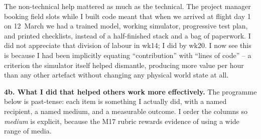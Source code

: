 The non-technical help mattered as much as the technical. The project manager booking field slots while I built code meant that when we arrived at flight day 1 on 12~March we had a trained model, working simulator, progressive test plan, and printed checklists, instead of a half-finished stack and a bag of paperwork. I did not appreciate that division of labour in wk14; I did by wk20. I now see this is because I had been implicitly equating ``contribution'' with ``lines of code'' -- a criterion the simulator itself helped dismantle, producing more value per hour than any other artefact without changing any physical world state at all.

\textbf{4b. What I did that helped others work more effectively.}  The programme below is past-tense: each item is something I actually did, with a named recipient, a named medium, and a measurable outcome. I order the columns so \textit{medium} is explicit, because the M17 rubric rewards evidence of using a wide range of media.

